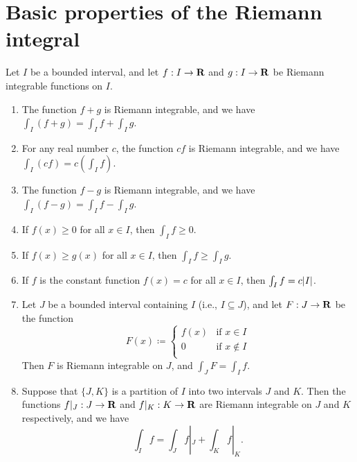 \section{Basic properties of the Riemann integral}\label{sec 11.4}

\begin{theorem}\label{11.4.1}
  Let \(I\) be a bounded interval, and let \(f : I \to \mathbf{R}\) and \(g : I \to \mathbf{R}\) be Riemann integrable functions on \(I\).
  \begin{enumerate}
    \item The function \(f + g\) is Riemann integrable, and we have \(\int_I (f + g) = \int_I f + \int_I g\).
    \item For any real number \(c\), the function \(cf\) is Riemann integrable, and we have \(\int_I (cf) = c(\int_I f)\).
    \item The function \(f - g\) is Riemann integrable, and we have \(\int_I (f - g) = \int_I f - \int_I g\).
    \item If \(f(x) \geq 0\) for all \(x \in I\), then \(\int_I f \geq 0\).
    \item If \(f(x) \geq g(x)\) for all \(x \in I\), then \(\int_I f \geq \int_I g\).
    \item If \(f\) is the constant function \(f(x) = c\) for all \(x \in I\), then \(\int_I f = c \abs{I}\).
    \item Let \(J\) be a bounded interval containing \(I\) (i.e., \(I \subseteq J\)), and let \(F : J \to \mathbf{R}\) be the function
          \[
            F(x) \coloneqq \begin{cases}
              f(x) & \text{if } x \in I    \\
              0    & \text{if } x \notin I \\
            \end{cases}
          \]
          Then \(F\) is Riemann integrable on \(J\), and \(\int_J F = \int_I f\).
    \item Suppose that \(\{J, K\}\) is a partition of \(I\) into two intervals \(J\) and \(K\).
          Then the functions \(f|_J : J \to \mathbf{R}\) and \(f|_K : K \to \mathbf{R}\) are Riemann integrable on \(J\) and \(K\) respectively, and we have
          \[
            \int_I f = \int_J f|_J + \int_K f|_K.
          \]
  \end{enumerate}
\end{theorem}

